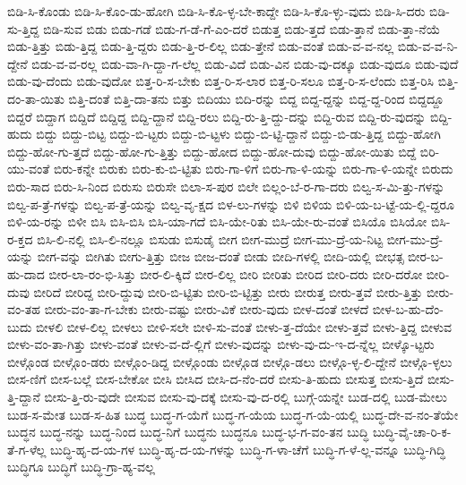 {ಬಿಡಿ-ಸಿ-ಕೊಂಡು
ಬಿಡಿ-ಸಿ-ಕೊಂ-ಡು-ಹೋಗಿ
ಬಿಡಿ-ಸಿ-ಕೊ-ಳ್ಳ-ಬೇ-ಕಾದ್ದೇ
ಬಿಡಿ-ಸಿ-ಕೊ-ಳ್ಳು-ವುದು
ಬಿಡಿ-ಸಿ-ದರು
ಬಿಡಿ-ಸು-ತ್ತಿದ್ದ
ಬಿಡಿ-ಸುವ
ಬಿಡು
ಬಿಡು-ಗಡೆ
ಬಿಡು-ಗ-ಡೆ-ಗೆ-ಎಂ-ದರೆ
ಬಿಡುತ್ತ
ಬಿಡು-ತ್ತದೆ
ಬಿಡು-ತ್ತಾನೆ
ಬಿಡು-ತ್ತಾ-ನೆಯೆ
ಬಿಡು-ತ್ತಿತ್ತು
ಬಿಡು-ತ್ತಿದ್ದ
ಬಿಡು-ತ್ತಿ-ದ್ದರು
ಬಿಡು-ತ್ತಿ-ರ-ಲಿಲ್ಲ
ಬಿಡು-ತ್ತೇನೆ
ಬಿಡು-ವಂತೆ
ಬಿಡು-ವ-ವ-ನಲ್ಲ
ಬಿಡು-ವ-ವ-ನಿ-ದ್ದೇನೆ
ಬಿಡು-ವ-ವ-ರಲ್ಲ
ಬಿಡು-ವಾ-ಗಿ-ದ್ದಾ-ಗ-ಲೆಲ್ಲ
ಬಿಡು-ವಿದೆ
ಬಿಡು-ವಿನ
ಬಿಡು-ವು-ದಕ್ಕೂ
ಬಿಡು-ವುದೂ
ಬಿಡು-ವುದೆ
ಬಿಡು-ವು-ದೆಂದು
ಬಿಡು-ವುದೋ
ಬಿತ್ತ-ರಿ-ಸ-ಬೇಕು
ಬಿತ್ತ-ರಿ-ಸ-ಲಾರ
ಬಿತ್ತ-ರಿ-ಸಲೂ
ಬಿತ್ತ-ರಿ-ಸ-ಲೆಂದು
ಬಿತ್ತ-ರಿಸಿ
ಬಿತ್ತಿ-ದಂ-ತಾ-ಯಿತು
ಬಿತ್ತಿ-ದಂತೆ
ಬಿತ್ತಿ-ದಾ-ತನು
ಬಿತ್ತು
ಬಿದಿಯು
ಬಿದಿ-ರನ್ನು
ಬಿದ್ದ
ಬಿದ್ದ-ದ್ದನ್ನು
ಬಿದ್ದ-ದ್ದ-ರಿಂದ
ಬಿದ್ದದ್ದೂ
ಬಿದ್ದರೆ
ಬಿದ್ದಾಗ
ಬಿದ್ದಿದೆ
ಬಿದ್ದಿದ್ದ
ಬಿದ್ದಿ-ದ್ದಾನೆ
ಬಿದ್ದಿ-ರಲು
ಬಿದ್ದಿ-ರು-ತ್ತಿ-ದ್ದು-ದನ್ನು
ಬಿದ್ದಿ-ರುವ
ಬಿದ್ದಿ-ರು-ವುದನ್ನು
ಬಿದ್ದಿ-ಹುದು
ಬಿದ್ದು
ಬಿದ್ದು-ಬಿಟ್ಟ
ಬಿದ್ದು-ಬಿ-ಟ್ಟರು
ಬಿದ್ದು-ಬಿ-ಟ್ಟಳು
ಬಿದ್ದು-ಬಿ-ಟ್ಟಿ-ದ್ದಾನೆ
ಬಿದ್ದು-ಬಿ-ಡು-ತ್ತಿದ್ದ
ಬಿದ್ದು-ಹೋಗಿ
ಬಿದ್ದು-ಹೋ-ಗು-ತ್ತದೆ
ಬಿದ್ದು-ಹೋ-ಗು-ತ್ತಿತ್ತು
ಬಿದ್ದು-ಹೋದ
ಬಿದ್ದು-ಹೋ-ದುವು
ಬಿದ್ದು-ಹೋ-ಯಿತು
ಬಿದ್ದೆ
ಬಿರಿ-ಯು-ವಂತೆ
ಬಿರು-ಕನ್ನೇ
ಬಿರುಕು
ಬಿರು-ಕು-ಬಿ-ಟ್ಟಿತು
ಬಿರು-ಗಾ-ಳಿಗೆ
ಬಿರು-ಗಾ-ಳಿ-ಯನ್ನು
ಬಿರು-ಗಾ-ಳಿ-ಯನ್ನೇ
ಬಿರುದು
ಬಿರು-ಸಾದ
ಬಿರು-ಸಿ-ನಿಂದ
ಬಿರುಸು
ಬಿರುಸೇ
ಬಿಲಾ-ಸ-ಪುರ
ಬಿಲೇ
ಬಿಲ್ಲಂ-ಬೆ-ರ-ಗಾ-ದರು
ಬಿಲ್ವ-ಸ-ಮಿ-ತ್ತು-ಗಳನ್ನು
ಬಿಲ್ವ-ಪ-ತ್ರೆ-ಗಳನ್ನು
ಬಿಲ್ವ-ಪ-ತ್ರೆ-ಯನ್ನು
ಬಿಲ್ವ-ವೃ-ಕ್ಷದ
ಬಿಳ-ಲು-ಗಳನ್ನು
ಬಿಳಿ
ಬಿಳಿಯ
ಬಿಳಿ-ಯ-ಬ-ಟ್ಟೆ-ಯ-ಲ್ಲಿ-ದ್ದರೂ
ಬಿಳಿ-ಯ-ರನ್ನು
ಬಿಳೀ
ಬಿಸಿ
ಬಿಸಿ-ಬಿಸಿ
ಬಿಸಿ-ಯಾ-ಗದೆ
ಬಿಸಿ-ಯೇ-ರಿತು
ಬಿಸಿ-ಯೇ-ರು-ವಂತೆ
ಬಿಸಿಯೊ
ಬಿಸಿಯೋ
ಬಿಸಿ-ರ-ಕ್ತದ
ಬಿಸಿ-ಲಿ-ನಲ್ಲಿ
ಬಿಸಿ-ಲಿ-ನಲ್ಲೂ
ಬಿಸುಡು
ಬಿಸುಡೈ
ಬೀಗ
ಬೀಗ-ಮುದ್ರೆ
ಬೀಗ-ಮು-ದ್ರೆ-ಯ-ನಿಟ್ಟ
ಬೀಗ-ಮು-ದ್ರೆ-ಯನ್ನು
ಬೀಗ-ವನ್ನು
ಬೀಗಿತು
ಬೀಗು-ತ್ತಿತ್ತು
ಬೀಜ
ಬೀಜ-ದಂತೆ
ಬೀಡು
ಬೀದಿ-ಗಳಲ್ಲಿ
ಬೀದಿ-ಯಲ್ಲಿ
ಬೀಭತ್ಸ
ಬೀರ-ಬ-ಹು-ದಾದ
ಬೀರ-ಲಾ-ರಂ-ಭಿ-ಸಿತ್ತು
ಬೀರ-ಲಿ-ಕ್ಕಿದೆ
ಬೀರ-ಲಿಲ್ಲ
ಬೀರಿ
ಬೀರಿತು
ಬೀರಿದ
ಬೀರಿ-ದರು
ಬೀರಿ-ದರೋ
ಬೀರಿ-ದುವು
ಬೀರಿದೆ
ಬೀರಿದ್ದ
ಬೀರಿ-ದ್ದುವು
ಬೀರಿ-ಬಿ-ಟ್ಟಿತು
ಬೀರಿ-ಬಿ-ಟ್ಟಿತ್ತು
ಬೀರು
ಬೀರುತ್ತ
ಬೀರು-ತ್ತವೆ
ಬೀರು-ತ್ತಿತ್ತು
ಬೀರು-ವಂ-ತಹ
ಬೀರು-ವಂ-ತಾ-ಗ-ಬೇಕು
ಬೀರು-ವಷ್ಟು
ಬೀರು-ವಿಕೆ
ಬೀರು-ವುದು
ಬೀಳ-ದಂತೆ
ಬೀಳದೆ
ಬೀಳ-ಬ-ಹು-ದೆಂ-ಬುದು
ಬೀಳಲಿ
ಬೀಳ-ಲಿಲ್ಲ
ಬೀಳಲು
ಬೀಳಿ-ಸಲೇ
ಬೀಳಿ-ಸು-ವಂತೆ
ಬೀಳು-ತ್ತ-ದೆಯೇ
ಬೀಳು-ತ್ತವೆ
ಬೀಳು-ತ್ತಿದ್ದ
ಬೀಳುವ
ಬೀಳು-ವಂ-ತಾ-ಗಿತ್ತು
ಬೀಳು-ವಂತೆ
ಬೀಳು-ವ-ದೆ-ಲ್ಲಿಗೆ
ಬೀಳು-ವುದನ್ನು
ಬೀಳು-ವು-ದು-ಇ-ದ-ನ್ನೆಲ್ಲ
ಬೀಳ್ಕೊ-ಟ್ಟರು
ಬೀಳ್ಗೊಂಡ
ಬೀಳ್ಗೊಂ-ಡರು
ಬೀಳ್ಗೊಂ-ಡಿದ್ದ
ಬೀಳ್ಗೊಂಡು
ಬೀಳ್ಗೊಡ
ಬೀಳ್ಗೊ-ಡಲು
ಬೀಳ್ಗೊ-ಳ್ಳ-ಲಿ-ದ್ದೇನೆ
ಬೀಳ್ಗೊ-ಳ್ಳಲು
ಬೀಸ-ಣಿಗೆ
ಬೀಸ-ಬಲ್ಲೆ
ಬೀಸ-ಬೇಕೋ
ಬೀಸಿ
ಬೀಸಿದ
ಬೀಸಿ-ದ-ನೆಂ-ದರೆ
ಬೀಸು-ತಿ-ಹುದು
ಬೀಸುತ್ತ
ಬೀಸು-ತ್ತಿದೆ
ಬೀಸು-ತ್ತಿ-ದ್ದಾನೆ
ಬೀಸು-ತ್ತಿ-ರು-ವುದೇ
ಬೀಸುವ
ಬೀಸು-ವು-ದಕ್ಕೆ
ಬೀಸು-ವು-ದ-ರಲ್ಲಿ
ಬುಗ್ಗೆ-ಯನ್ನೇ
ಬುಡ-ದಲ್ಲಿ
ಬುಡ-ಮೇಲು
ಬುಡ-ಸ-ಮೇತ
ಬುಡ-ಸ-ಹಿತ
ಬುದ್ಧ
ಬುದ್ಧ-ಗ-ಯೆಗೆ
ಬುದ್ಧ-ಗ-ಯೆಯ
ಬುದ್ಧ-ಗ-ಯೆ-ಯಲ್ಲಿ
ಬುದ್ಧ-ದೇ-ವ-ನಂ-ತೆಯೇ
ಬುದ್ಧನ
ಬುದ್ಧ-ನನ್ನು
ಬುದ್ಧ-ನಿಂದ
ಬುದ್ಧ-ನಿಗೆ
ಬುದ್ಧನು
ಬುದ್ಧನೂ
ಬುದ್ಧ-ಭ-ಗ-ವಂ-ತನ
ಬುದ್ಧಿ
ಬುದ್ಧಿ-ವೈ-ಚಾ-ರಿ-ಕ-ತೆ-ಗ-ಳೆಲ್ಲ
ಬುದ್ಧಿ-ಹೃ-ದ-ಯ-ಗಳ
ಬುದ್ಧಿ-ಹೃ-ದ-ಯ-ಗಳನ್ನು
ಬುದ್ಧಿ-ಗ-ಳಾ-ಚೆಗೆ
ಬುದ್ಧಿ-ಗ-ಳೆ-ಲ್ಲ-ವನ್ನೂ
ಬುದ್ಧಿ-ಗಿದ್ಧಿ
ಬುದ್ಧಿಗೂ
ಬುದ್ಧಿಗೆ
ಬುದ್ಧಿ-ಗ್ರಾ-ಹ್ಯ-ವಲ್ಲ
}
